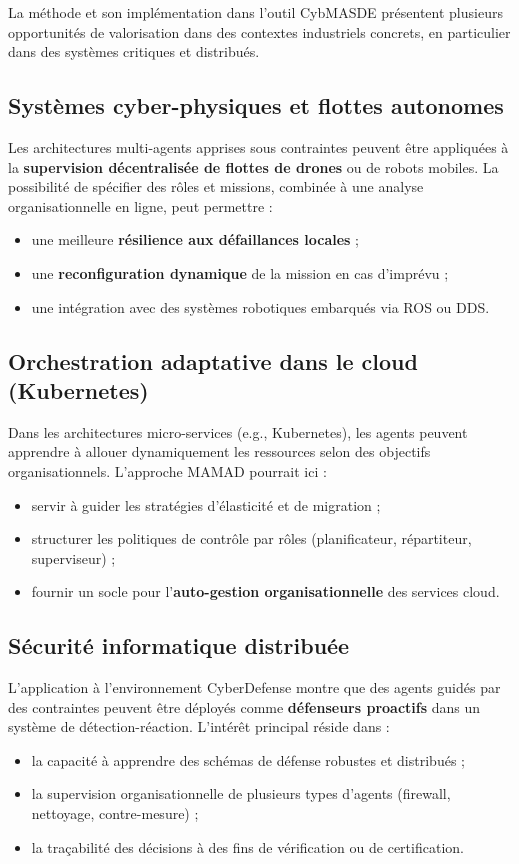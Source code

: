 \noindent
La méthode  et son implémentation dans l’outil CybMASDE présentent plusieurs opportunités de valorisation dans des contextes industriels concrets, en particulier dans des systèmes critiques et distribués.

\subsection*{Systèmes cyber-physiques et flottes autonomes}

Les architectures multi-agents apprises sous contraintes peuvent être appliquées à la \textbf{supervision décentralisée de flottes de drones} ou de robots mobiles. La possibilité de spécifier des rôles et missions, combinée à une analyse organisationnelle en ligne, peut permettre :
\begin{itemize}
    \item une meilleure \textbf{résilience aux défaillances locales} ;
    \item une \textbf{reconfiguration dynamique} de la mission en cas d’imprévu ;
    \item une intégration avec des systèmes robotiques embarqués via ROS ou DDS.
\end{itemize}

\subsection*{Orchestration adaptative dans le cloud (Kubernetes)}

Dans les architectures micro-services (e.g., Kubernetes), les agents peuvent apprendre à allouer dynamiquement les ressources selon des objectifs organisationnels. L’approche MAMAD pourrait ici :
\begin{itemize}
    \item servir à guider les stratégies d’élasticité et de migration ;
    \item structurer les politiques de contrôle par rôles (planificateur, répartiteur, superviseur) ;
    \item fournir un socle pour l’\textbf{auto-gestion organisationnelle} des services cloud.
\end{itemize}

\subsection*{Sécurité informatique distribuée}

L’application à l’environnement CyberDefense montre que des agents guidés par des contraintes peuvent être déployés comme \textbf{défenseurs proactifs} dans un système de détection-réaction. L’intérêt principal réside dans :
\begin{itemize}
    \item la capacité à apprendre des schémas de défense robustes et distribués ;
    \item la supervision organisationnelle de plusieurs types d’agents (firewall, nettoyage, contre-mesure) ;
    \item la traçabilité des décisions à des fins de vérification ou de certification.
\end{itemize}

